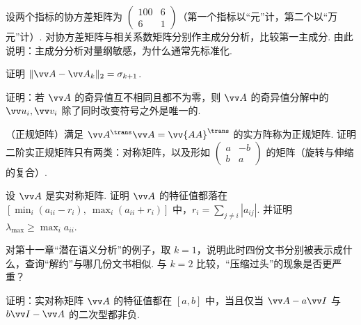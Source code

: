 {\begin{exB}
			\item\label{ex:dec:B9} 设两个指标的协方差矩阵为 $\begin{pmatrix}100&6\\6&1\end{pmatrix}$（第一个指标以“元”计，第二个以“万元”计）. 对协方差矩阵与相关系数矩阵分别作主成分分析，比较第一主成分. 由此说明：主成分分析对量纲敏感，为什么通常先标准化.
			\item\label{ex:dec:B10} 证明 $\|\vv A-\vv A_k\|_2=\sigma_{k+1}$.
			\item\label{ex:dec:B11} 证明：若 $\vv A$ 的奇异值互不相同且都不为零，则 $\vv A$ 的奇异值分解中的 $\vv u_i,\vv v_i$ 除了同时改变符号之外是唯一的.
			\item\label{ex:dec:B12} （正规矩阵）满足 $\vv A^\trans\vv A=\vv{AA}^\trans$ 的实方阵称为正规矩阵. 证明二阶实正规矩阵只有两类：对称矩阵，以及形如 $\begin{pmatrix}a&-b\\b&a\end{pmatrix}$ 的矩阵（旋转与伸缩的复合）.
			\item\label{ex:dec:B13} 设 $\vv A$ 是实对称矩阵. 证明 $\vv A$ 的特征值都落在 $[\min_i(a_{ii}-r_i),\ \max_i(a_{ii}+r_i)]$ 中，$r_i=\sum_{j\ne i}|a_{ij}|$. 并证明 $\lambda_{\max}\ge\max_ia_{ii}$.
			\item\label{ex:dec:B14} 对第十一章“潜在语义分析”的例子，取 $k=1$，说明此时四份文书分别被表示成什么，查询“解约”与哪几份文书相似. 与 $k=2$ 比较，“压缩过头”的现象是否更严重？
			\item\label{ex:dec:B15} 证明：实对称矩阵 $\vv A$ 的特征值都在 $[a,b]$ 中，当且仅当 $\vv A-a\vv I$ 与 $b\vv I-\vv A$ 的二次型都非负.
		\end{exB}
		
}
